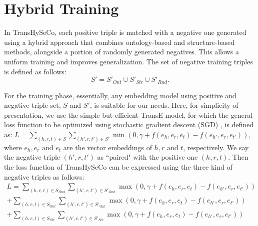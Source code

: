 \documentclass[sigconf]{acmart}
\newcommand{\TransHI}{TransHySeCo\xspace}
\begin{document}

\section{Hybrid Training}
\label{sect:initialiteration}
In \TransHI, each positive triple is matched with a negative one generated using a hybrid approach that combines ontology-based and structure-based methods, alongside a portion of randomly generated negatives. This allows a uniform training and improves generalization. The set of negative training triples is defined as follows: $$S'=S'_{Ont} \cup S'_{Str} \cup S'_{Rnd}.$$ 

For the training phase, essentially, any embedding model using positive and negative triple set, $S$ and $S'$, is suitable for our needs. Here, 
for simplicity of presentation, we use the simple but efficient TransE \cite{bordes} model, for which the general loss function %
to be optimized using stochastic gradient descent (SGD) \cite{SGD}, is defined as:
$
L = \sum_{(h,r,t) \in S} \sum_{(h',r,t') \in S'} \min(0, \gamma +
f(e_h, e_r, e_t) - f(e_{h'}, e_r, e_{t'})),
$
where $e_h, e_r \text { and } e_t$ are  the vector embeddings of $h, r \text { and } t$, respectively. We say the negative triple $(h',r,t')$ as ``paired" with the positive one $(h,r,t)$.
\noindent Then the loss function of \TransHI can be   expressed using the three kind of negative  triples as follows:
\[ 
\begin{split}
L= \sum_{(h,r,t) \in S_{Rnd}} \sum_{(h',r,t') \in S'_{Rnd}}  \max(0, \gamma + f(e_h, e_r, e_t) - f(e_{h'}, e_r, e_{t'})) \\
 + \sum_{(h,r,t) \in S_{Ont}} \sum_{(h',r,t') \in S'_{\text{Ont}}} \max(0, \gamma + f(e_h, e_r, e_t) - f(e_{h'}, e_r, e_{t'})) \\
 + \sum_{(h,r,t) \in S_{Str}} \sum_{(h',r,t') \in S'_{Str}} \max(0, \gamma + f(e_h, e_r, e_t) - f(e_{h'}, e_r, e_{t'})) 
\end{split}
\]     
\end{document}
